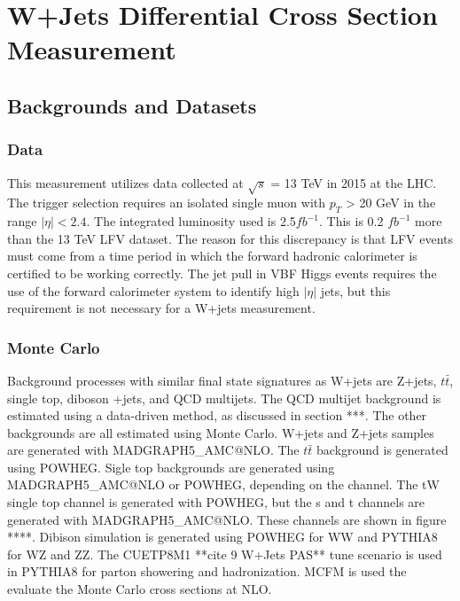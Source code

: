 \documentclass[oneside, letterpaper, oldfontcommands]{memoir}
\begin{document}
{{{\chapter{W+Jets Differential Cross Section Measurement}\label{wjets}
\section{Backgrounds and Datasets}
\subsection{Data}
\qquad This measurement utilizes data collected at $\sqrt{s}$ = 13 TeV in 2015 at the LHC. The trigger selection requires an isolated single muon with $p_{T}$ > 20 GeV in the range $|\eta| < 2.4$. The integrated luminosity used is 2.5$fb^{-1}$. This is 0.2 $fb^{-1}$ more than the 13 TeV LFV dataset. The reason for this discrepancy is that LFV events must come from a time period in which the forward hadronic calorimeter is certified to be working correctly. The jet pull in VBF Higgs events requires the use of the forward calorimeter system to identify high $|\eta|$ jets, but this requirement is not necessary for a W+jets measurement.

\subsection{Monte Carlo}
\qqaud Background processes with similar final state signatures as W+jets are Z+jets, $t\bar{t}$, single top, diboson +jets, and QCD multijets. The QCD multijet background is estimated using a data-driven method, as discussed in section ***. The other backgrounds are all estimated using Monte Carlo. W+jets and Z+jets samples are generated with MADGRAPH5_AMC@NLO. The $t\bar{t}$ background is generated using POWHEG. Sigle top backgrounds are generated using MADGRAPH5_AMC@NLO or POWHEG, depending on the channel. The tW single top channel is generated with POWHEG, but the s and t channels are generated with MADGRAPH5_AMC@NLO. These channels are shown in figure ****. Dibison simulation is generated using POWHEG for WW and PYTHIA8 for WZ and ZZ. The CUETP8M1 **cite 9 W+Jets PAS** tune scenario is used in PYTHIA8 for parton showering and hadronization. MCFM is used the evaluate the Monte Carlo cross sections at NLO. 

}}}
\end{document}
